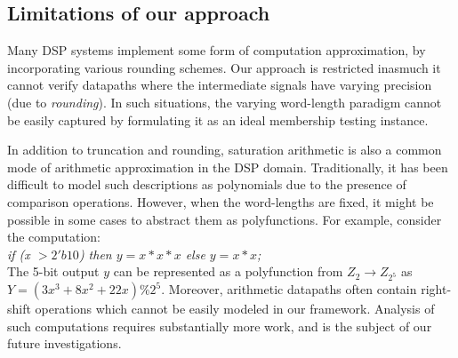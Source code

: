 \subsection{Limitations of our approach}
Many DSP systems implement some form of computation approximation, by
incorporating various rounding schemes. Our approach is restricted
inasmuch it cannot verify datapaths where the intermediate signals
have varying precision (due to {\it rounding}). In such situations,
the varying word-length paradigm cannot be easily captured by
formulating it as an ideal membership testing instance. 

In addition to truncation and rounding, saturation arithmetic is also
a common mode of arithmetic approximation in the DSP
domain. Traditionally, it has been difficult to model such
descriptions as polynomials due to the presence of comparison
operations. However, when the word-lengths are fixed, it might be
possible in some cases to abstract them as polyfunctions. For example,
consider the computation: \\
{\it if (x $> 2'b10$) then $y = x*x*x$ else $y = x*x$;}\\
The 5-bit output $y$ can be represented as a polyfunction from $Z_2
\rightarrow Z_{2^5}$ as $Y = (3x^3 + 8x^2 + 22x) \%2^5$.  Moreover, 
arithmetic datapaths often contain right-shift operations which
cannot be easily modeled in our framework. Analysis of such
computations requires substantially more work, and is the subject of
our future investigations. 

